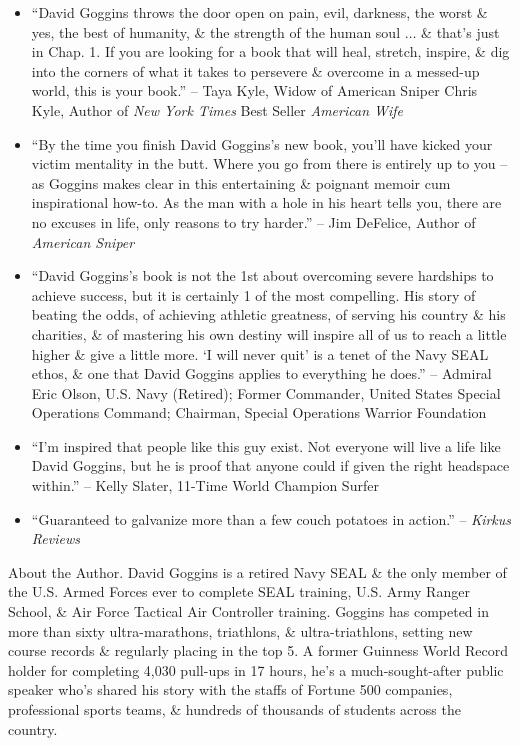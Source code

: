 \documentclass{article}
\begin{document}
\begin{enumerate}
\begin{itemize}
		\item ``{\sc David Goggins} throws the door open on pain, evil, darkness, the worst \& yes, the best of humanity, \& the strength of the human soul $\ldots$ \& that's just in Chap. 1. If you are looking for a book that will heal, stretch, inspire, \& dig into the corners of what it takes to persevere \& overcome in a messed-up world, this is your book.'' -- {\sc Taya Kyle}, Widow of American Sniper Chris Kyle, Author of {\it New York Times} Best Seller {\it American Wife}
		\item ``By the time you finish {\sc David Goggins}'s new book, you'll have kicked your victim mentality in the butt. Where you go from there is entirely up to you -- as {\sc Goggins} makes clear in this entertaining \& poignant memoir cum inspirational how-to. As the man with a hole in his heart tells you, there are no excuses in life, only reasons to try harder.'' -- {\sc Jim DeFelice}, Author of {\it American Sniper}
		\item ``{\sc David Goggins}'s book is not the 1st about overcoming severe hardships to achieve success, but it is certainly 1 of the most compelling. His story of beating the odds, of achieving athletic greatness, of serving his country \& his charities, \& of mastering his own destiny will inspire all of us to reach a little higher \& give a little more. `I will never quit' is a tenet of the Navy SEAL ethos, \& one that {\sc David Goggins} applies to everything he does.'' -- {\sc Admiral Eric Olson},  U.S. Navy (Retired); Former Commander, United States Special Operations Command; Chairman, Special Operations Warrior Foundation
		\item ``I'm inspired that people like this guy exist. Not everyone will live a life like {\sc David Goggins}, but he is proof that anyone could if given the right headspace within.'' -- {\sc Kelly Slater}, 11-Time World Champion Surfer
		\item ``Guaranteed to galvanize more than a few couch potatoes in action.'' -- {\it Kirkus Reviews}
	\end{itemize}
	{\sf About the Author.} {\sc David Goggins} is a retired Navy SEAL \& the only member of the U.S. Armed Forces ever to complete SEAL training, U.S. Army Ranger School, \& Air Force Tactical Air Controller training. {\sc Goggins} has competed in more than sixty ultra-marathons, triathlons, \& ultra-triathlons, setting new course records \& regularly placing in the top 5. A former Guinness World Record holder for completing 4,030 pull-ups in 17 hours, he's a much-sought-after public speaker who's shared his story with the staffs of Fortune 500 companies, professional sports teams, \& hundreds of thousands of students across the country.


\end{enumerate}
\end{document}
